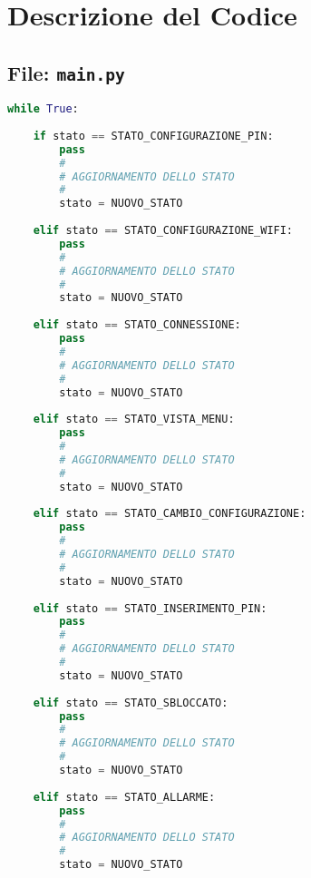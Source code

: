 \documentclass[12pt,a4paper]{article}
\begin{document}
	\section{Descrizione del Codice}
	
	\subsection{File: \texttt{main.py}}
	\begin{lstlisting}[language=Python, caption={Il main del programma è stato sviluppato come un automa a stati a finiti e qui sono rappresentati i vari stati. Lo stato di configurazione pin è lo stato che viene eseguito alla prima esecuzione del programma: qui viene configurato il file contenente il pin d'accesso al caveaux. Lo stato di configurazione wifi è eseguito sequenzialmente a quello di configurazione pin. Lo stato di connessione permette la connessione all'MQTT. Finiti i vari step di connessione si accede allo stato di vista menu, in cui vengono riportati parametri interni al caveaux, quali temperatura e umidità, ed è inoltre possibile scegliere di accedere al caveaux o di cambiare configurazione. Entrambe le opzioni appena descritte vengono eseguite in appositi stati: stato di inserimento pin e stato di cambio configurazione. Una volta sbloccato il caveaux si entra nello stato sbloccato. In caso di intrusione o valori di temperatura e umidità fuori norma si entra nello stato di allarme.}]
while True:
		
	if stato == STATO_CONFIGURAZIONE_PIN:
		pass
		#
		# AGGIORNAMENTO DELLO STATO
		#
		stato = NUOVO_STATO
		
	elif stato == STATO_CONFIGURAZIONE_WIFI:
		pass
		#
		# AGGIORNAMENTO DELLO STATO
		#
		stato = NUOVO_STATO
		
	elif stato == STATO_CONNESSIONE:
		pass
		#
		# AGGIORNAMENTO DELLO STATO
		#
		stato = NUOVO_STATO
		
	elif stato == STATO_VISTA_MENU:
		pass
		#
		# AGGIORNAMENTO DELLO STATO
		#
		stato = NUOVO_STATO
		
	elif stato == STATO_CAMBIO_CONFIGURAZIONE:
		pass
		#
		# AGGIORNAMENTO DELLO STATO
		#
		stato = NUOVO_STATO
		
	elif stato == STATO_INSERIMENTO_PIN:
		pass
		#
		# AGGIORNAMENTO DELLO STATO
		#
		stato = NUOVO_STATO
		
	elif stato == STATO_SBLOCCATO:
		pass
		#
		# AGGIORNAMENTO DELLO STATO
		#
		stato = NUOVO_STATO
		
	elif stato == STATO_ALLARME:
		pass
		#
		# AGGIORNAMENTO DELLO STATO
		#
		stato = NUOVO_STATO
	\end{lstlisting}
	
\end{document}
